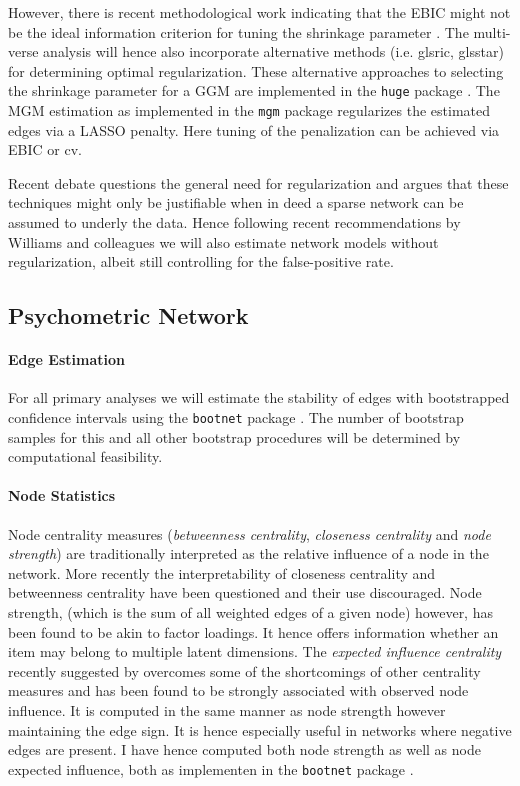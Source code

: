 \documentclass[a4paper,12pt]{article} %
\begin{document}
		However, there is recent methodological work indicating that the EBIC might not be the ideal information criterion for tuning the shrinkage parameter \parencite{wysocki_penalty_2019}.
		The multi-verse analysis will hence also incorporate alternative methods (i.e. gls{ric}, gls{star}) for determining optimal regularization.
		These alternative approaches to selecting the shrinkage parameter for a GGM are implemented in the \texttt{huge} package \parencite{huge}.
		The MGM estimation as implemented in the \texttt{mgm} package \parencite{mgm} regularizes the estimated edges via a LASSO penalty.
		Here tuning of the penalization can be achieved via EBIC or \gls{cv}.

		Recent debate \parencite{williams_nonregularized_2019} questions the general need for regularization and argues that these techniques might only be justifiable when in deed a sparse network can be assumed to underly the data.
		Hence following recent recommendations by Williams and colleagues \parencite{williams_nonregularized_2019} we will also estimate network models without regularization, albeit still controlling for the false-positive rate.

		\subsection{Psychometric Network}

		\paragraph{Edge Estimation}
		For all primary analyses we will estimate the stability of edges with bootstrapped confidence intervals using the \texttt{bootnet} package \parencite{epskamp_estimating_2018}.
		The number of bootstrap samples for this and all other bootstrap procedures will be determined by computational feasibility.

		\paragraph{Node Statistics}
		Node centrality measures (\textit{betweenness centrality}, \textit{closeness centrality} and \textit{node strength}) are traditionally interpreted as the relative influence of a node in the network.
		More recently the interpretability of closeness centrality and betweenness centrality have been questioned and their use discouraged.
		Node strength, (which is the sum of all weighted edges of a given node) however, has been found to be akin to factor loadings.
		It hence offers information whether an item may belong to multiple latent dimensions.
		The \textit{expected influence centrality} recently suggested by \textcites{robinaugh_identifying_2016} overcomes some of the shortcomings of other centrality measures and has been found to be strongly associated with observed node influence. 
		It is computed in the same manner as node strength however maintaining the edge sign. It is hence especially useful in networks where negative edges are present.
		I have hence computed both node strength as well as node expected influence, both as implementen in the \texttt{bootnet} package \parencite{epskamp_estimating_2018}.
		
\end{document}
